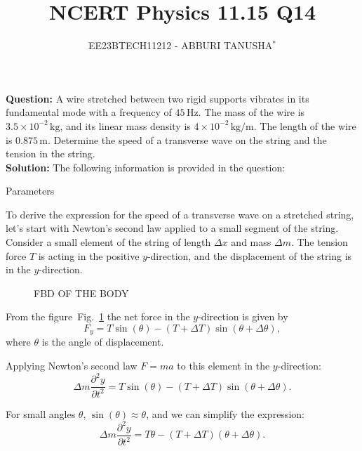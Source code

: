 \documentclass[journal,12pt,twocolumn]{IEEEtran}
\title{
	
\title{NCERT Physics 11.15 Q14}
\author{EE23BTECH11212 - ABBURI TANUSHA$^{*}$%
}


}
\newcommand\figref{Fig.~\ref}
\theoremstyle{remark}
\begin{document}
\maketitle

\textbf{Question:} 
A wire stretched between two rigid supports vibrates in its fundamental mode with a frequency of $45 \, \text{Hz}$. The mass of the wire is $3.5 \times 10^{-2} \, \text{kg}$, and its linear mass density is $4 \times 10^{-2} \, \text{kg/m}$. The length of the wire is $0.875 \, \text{m}$. Determine the speed of a transverse wave on the string and the tension in the string.
\\
     
\textbf{Solution: }
The following information is provided in the question:

 \begin{table}[h]
 	\centering
 	\resizebox{6 cm}{!}{
 		
 	}
 	\vspace{6 pt}
 	\caption{Parameters}
 	\label{tab:my_label} 
 \end{table}
 
 To derive the expression for the speed of a transverse wave on a stretched string, let's start with Newton's second law applied to a small segment of the string. Consider a small element of the string of length $\Delta x$ and mass $\Delta m$. The tension force $T$ is acting in the positive $y$-direction, and the displacement of the string is in the $y$-direction.
 
\begin{figure}[h]
	\centering
	
	\caption{FBD OF THE BODY}
	\label{fig:2}
\end{figure}

From the figure~\figref{fig:2} the net force in the $y$-direction is given by 
\begin{equation}\label{eq:force}
    F_y = T \sin(\theta) - (T + \Delta T) \sin(\theta + \Delta \theta),
\end{equation}
where $\theta$ is the angle of displacement.

Applying Newton's second law $F = ma$ to this element in the $y$-direction:
\begin{equation}\label{eq:newton}
    \Delta m \frac{\partial^2y}{\partial t^2} = T \sin(\theta) - (T + \Delta T) \sin(\theta + \Delta \theta).
\end{equation}

For small angles $\theta$, $\sin(\theta) \approx \theta$, and we can simplify the expression:
\begin{equation}\label{eq:simplified}
    \Delta m \frac{\partial^2y}{\partial t^2} = T \theta - (T + \Delta T)(\theta + \Delta \theta).
\end{equation}
\end{document}
